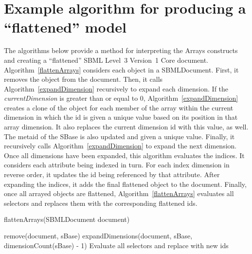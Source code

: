 


\section{Example algorithm for producing a ``flattened'' model}
\label{flatten}
The algorithms below provide a method for interpreting the Arrays
constructs and creating a ``flattened'' SBML Level~3 Version~1 Core
document.  Algorithm~\ref{flattenArrays} considers each \SBase object
in a SBMLDocument.  First, it removes the \SBase object from the
document.  Then, it calls
Algorithm~\ref{expandDimension} recursively to expand each dimension.
If the \emph{currentDimension} is greater than or equal to 0, Algorithm~\ref{expandDimension} creates a clone of the object for each
member of the array within the current dimension in which the id is
given a unique value based on its position in that array dimension.
It also replaces the current dimension id with this value, as
well. The metaid of the SBase is also updated and given a unique value.  Finally, it recursively calls Algorithm~\ref{expandDimension} to expand the next dimension.  Once all dimensions have been expanded, this algorithm evaluates the indices.  It considers each attribute being indexed in turn.  For each index dimension in reverse order, it updates the id being referenced by that attribute.  After expanding the indices, it adds the final flattened object to the document.  Finally, once all arrayed objects are flattened, Algorithm~\ref{flattenArrays} evaluates all selectors and replaces them with the corresponding flattened ids.

\begin{algorithm}[ht]
\label{flattenArrays}
  \caption{flattenArrays(SBMLDocument document)}
{
       remove(document, sBase)\;
       expandDimensions(document, sBase, dimensionCount(sBase) - 1)\;
}
Evaluate all selectors and replace with new ids\;
\end{algorithm}

